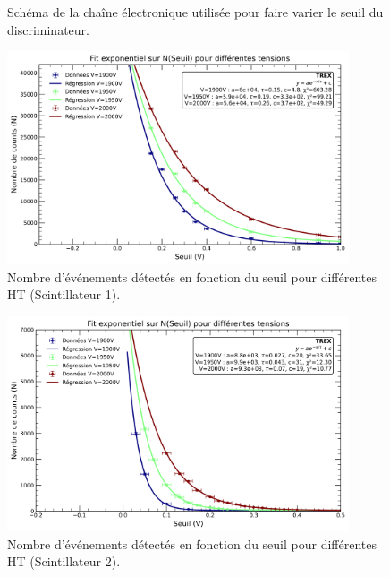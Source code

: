 \documentclass[a4paper,12pt,twoside]{article}
\begin{document}
\begin{figure}[H]
  \centering
  
  \caption{Schéma de la chaîne électronique utilisée pour faire varier le seuil du discriminateur.}
  \label{fig:variation_seuil}
\end{figure}


\begin{figure}[H]
    \centering
    \includegraphics[width=0.9\textwidth]{Images/Threshold_Scintillateur_1.png}
    \caption{Nombre d’événements détectés en fonction du seuil pour différentes HT (Scintillateur 1).}
    \label{fig:optimisation_scint1}
\end{figure}

\begin{figure}[H]
    \centering
    \includegraphics[width=0.9\textwidth]{Images/Threshold_Scintillateur_2.png}
    \caption{Nombre d’événements détectés en fonction du seuil pour différentes HT (Scintillateur 2).}
    \label{fig:optimisation_scint2}
\end{figure}
\end{document}
